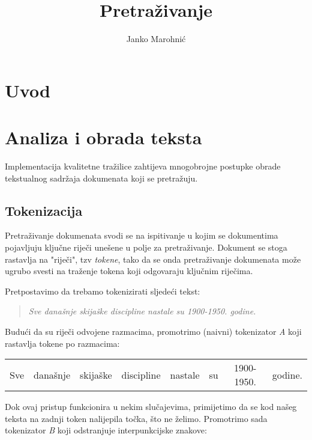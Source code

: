 \documentclass[11pt]{scrreprt}
\title{Pretraživanje}
\author{Janko Marohnić}
\begin{document}
\maketitle


\tableofcontents

\pagebreak


\chapter{Uvod}

\chapter{Analiza i obrada teksta}
\label{ch:processing}

Implementacija kvalitetne tražilice zahtijeva mnogobrojne postupke obrade tekstualnog sadržaja dokumenata koji se pretražuju.

\section{Tokenizacija}

Pretraživanje dokumenata svodi se na ispitivanje u kojim se dokumentima pojavljuju ključne riječi unešene u polje za pretraživanje. Dokument se stoga rastavlja na "riječi", tzv \textit{tokene}, tako da se onda pretraživanje dokumenata može ugrubo svesti na traženje tokena koji odgovaraju ključnim riječima.

Pretpostavimo da trebamo tokenizirati sljedeći tekst:

\begin{quote}
  \textit{Sve današnje skijaške discipline nastale su 1900-1950. godine.}
\end{quote}

Budući da su riječi odvojene razmacima, promotrimo (naivni) tokenizator \textit{A} koji rastavlja tokene po razmacima:

\begin{center}
  \begin{tabular}{cccccccc}
    Sve & današnje & skijaške & discipline & nastale & su & 1900-1950. & godine.
  \end{tabular}
\end{center}

Dok ovaj pristup funkcionira u nekim slučajevima, primijetimo da se kod našeg teksta na zadnji token nalijepila točka, što ne želimo. Promotrimo sada tokenizator \textit{B} koji odstranjuje interpunkcijske znakove:
\end{document}
